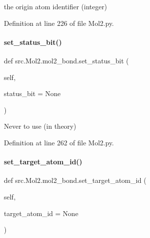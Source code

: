 the origin atom identifier (integer) 



Definition at line 226 of file Mol2.\+py.

\mbox{\label{classsrc_1_1Mol2_1_1mol2__bond_a626117c036a1736d76176e5af3c2e69a}} 
\paragraph{\texorpdfstring{set\+\_\+status\+\_\+bit()}{set\_status\_bit()}}
{\footnotesize\ttfamily def src.\+Mol2.\+mol2\+\_\+bond.\+set\+\_\+status\+\_\+bit (\begin{DoxyParamCaption}\item[{}]{self,  }\item[{}]{status\+\_\+bit = {\ttfamily None} }\end{DoxyParamCaption})}



Never to use (in theory) 



Definition at line 262 of file Mol2.\+py.

\mbox{\label{classsrc_1_1Mol2_1_1mol2__bond_a0534fd1edfa863de26314114bc007ff5}} 
\paragraph{\texorpdfstring{set\+\_\+target\+\_\+atom\+\_\+id()}{set\_target\_atom\_id()}}
{\footnotesize\ttfamily def src.\+Mol2.\+mol2\+\_\+bond.\+set\+\_\+target\+\_\+atom\+\_\+id (\begin{DoxyParamCaption}\item[{}]{self,  }\item[{}]{target\+\_\+atom\+\_\+id = {\ttfamily None} }\end{DoxyParamCaption})}



